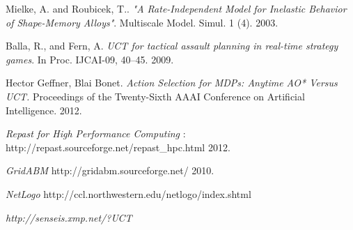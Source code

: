 \documentclass[11pt,oneside,a4paper,openright]{report}
\begin{document}
\begin{thebibliography}{50}
	Mielke, A. and Roubicek, T.. 
	\emph{"A Rate-Independent Model for Inelastic Behavior of Shape-Memory Alloys"}. 
	Multiscale Model. Simul. 1 (4). 
	2003.

	Balla, R., and Fern, A. 
	\emph{UCT for tactical assault planning in real-time strategy games}. In Proc. IJCAI-09, 40–45.
	2009. 

	Hector Geffner, Blai Bonet.
	\emph{Action Selection for MDPs: Anytime AO* Versus UCT.} 
	Proceedings of the Twenty-Sixth AAAI Conference on Artificial Intelligence.	
	2012.

	\emph{Repast for High Performance Computing} : http://repast.sourceforge.net/repast\_hpc.html
	2012.

	\emph{GridABM}
	http://gridabm.sourceforge.net/
	2010.

	\emph{NetLogo}
	http://ccl.northwestern.edu/netlogo/index.shtml


	\emph{http://senseis.xmp.net/?UCT}



\end{thebibliography}
\end{document}
